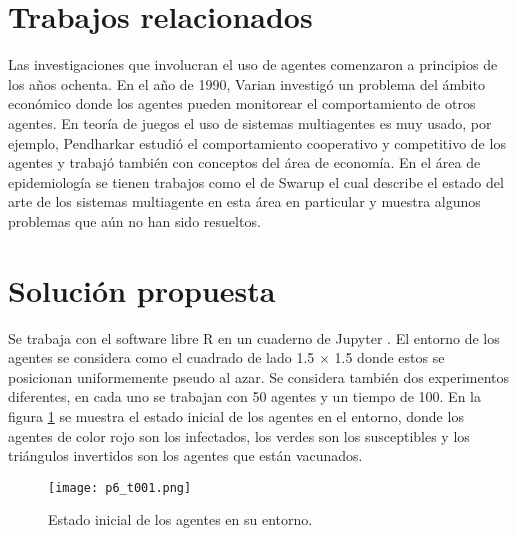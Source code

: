 \documentclass[final,6p,times,twocolumn]{elsarticle}
\begin{document}

\section{Trabajos relacionados}
\label{S:trela}
Las investigaciones que involucran el uso de agentes comenzaron a principios de los años ochenta. En el año de 1990, Varian \cite{Varian} investigó un problema del ámbito económico donde los agentes pueden monitorear el comportamiento de otros agentes. 
En teoría de juegos el uso de sistemas multiagentes es muy usado, por ejemplo, Pendharkar  \cite{gametheoretical} estudió el comportamiento cooperativo y competitivo de los agentes y trabajó también con conceptos del área de economía. En el área de epidemiología se tienen trabajos como el de Swarup \cite{Swarup} el cual describe el estado del arte de los sistemas multiagente en esta área en particular y muestra algunos problemas que aún no han sido resueltos. 
\section{Solución propuesta}
\label{S:Sprop}
Se trabaja con el software libre R \cite{R} en un cuaderno de Jupyter \cite{jupyter}. El entorno de los agentes se considera como el cuadrado de lado 1.5 $\times$ 1.5 donde estos se posicionan uniformemente pseudo al azar. Se considera también dos experimentos diferentes, en cada uno se trabajan con 50 agentes y un tiempo de 100. En la figura \ref{paso1} se muestra el estado inicial de los agentes en el entorno, donde los agentes de color rojo son los infectados, los verdes son los susceptibles y los triángulos invertidos son los agentes que están vacunados. 

\begin{figure}
\label{paso1}
\centering
\texttt{[image: p6\_t001.png]}
\caption{Estado inicial de los agentes en su entorno.}
\end{figure}
\end{document}
